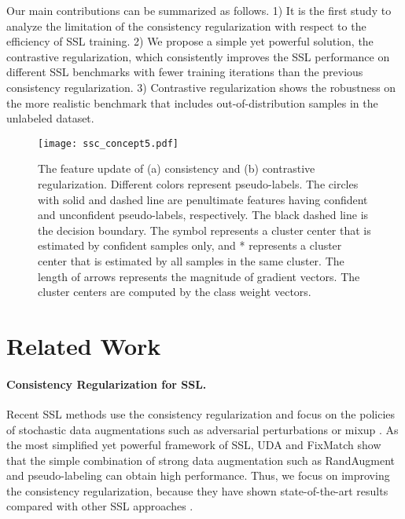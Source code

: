 \documentclass[letterpaper]{article} \usepackage{aaai22}  \usepackage{times}  \usepackage{helvet}  \usepackage{courier}  \usepackage[hyphens]{url}  \usepackage{graphicx} \urlstyle{rm} \def\UrlFont{\rm}  \usepackage{natbib}  \usepackage{caption} \DeclareCaptionStyle{ruled}{labelfont=normalfont,labelsep=colon,strut=off} \frenchspacing  \setlength{\pdfpagewidth}{8.5in}  \setlength{\pdfpageheight}{11in}  \usepackage{algorithm}
\begin{document}
Our main contributions can be summarized as follows. 
1) It is the first study to analyze the limitation of the consistency regularization with respect to the efficiency of SSL training.
2) We propose a simple yet powerful solution, the contrastive regularization, which consistently improves the SSL performance on different SSL benchmarks with fewer training iterations than the previous consistency regularization.
3) Contrastive regularization shows the robustness on the more realistic benchmark that includes out-of-distribution samples in the unlabeled dataset.

\begin{figure}
\centering
\texttt{[image: ssc\_concept5.pdf]}
\caption{The feature update of (a) consistency and (b) contrastive regularization. Different colors represent pseudo-labels. The circles with solid and dashed line are penultimate features having confident and unconfident pseudo-labels, respectively. The black dashed line is the decision boundary. The symbol  represents a cluster center that is estimated by confident samples only, and * represents a cluster center that is estimated by all samples in the same cluster. The length of arrows represents the magnitude of gradient vectors. The cluster centers are computed by the class weight vectors.}
\label{fig:concept}
\vspace{-0.1in}
\end{figure}

\section{Related Work}
\label{sec:RW}

\paragraph{Consistency Regularization for SSL.} Recent SSL methods use the consistency regularization \cite{laine2016temporal} and focus on the policies of stochastic data augmentations such as adversarial perturbations \cite{miyato2018virtual} or mixup \cite{berthelot2019remixmatch,berthelot2019mixmatch,zhang2018mixup}.
As the most simplified yet powerful framework of SSL, UDA and FixMatch \cite{xie2020unsupervised,sohn2020fixmatch} show that the simple combination of strong data augmentation such as RandAugment \cite{cubuk2020randaugment} and pseudo-labeling \cite{lee2013pseudo} can obtain high performance.
Thus, we focus on improving the consistency regularization, because they have shown state-of-the-art results compared with other SSL approaches \cite{shi2018transductive,iscen2019label}.
\end{document}
